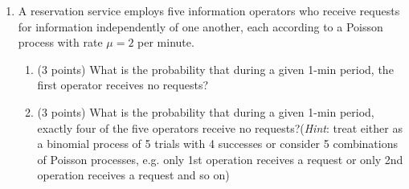 \documentclass[letterpaper,12pt,addpoints]{exam}
\begin{document}
\begin{enumerate}
\clearpage
\item A reservation service employs five information operators who receive requests for information independently of one another, each according to a Poisson process with rate $\mu=2$ per minute.
\begin{enumerate}
\item (3 points) What is the probability that during a given 1-min period, the first operator receives no requests?

\vspace{6cm}

\item (3 points) What is the probability that during a given 1-min period, exactly four of the five operators receive no requests?(\textit{Hint}: treat either as a binomial process of 5 trials with 4 successes or consider 5 combinations of Poisson processes, e.g. only 1st operation receives a request  or only 2nd operation receives a request and so on)
\end{enumerate}

\end{enumerate}
\end{document}
